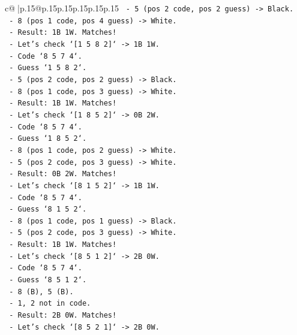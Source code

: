 \documentclass{article}
\begin{document}
{\begin{supertabular}{c@{$\;$}|p{.15\linewidth}@{}p{.15\linewidth}p{.15\linewidth}p{.15\linewidth}p{.15\linewidth}p{.15\linewidth}}
{{{\texttt{          {-} 5 (pos 2 code, pos 2 guess) {-}> Black.} \\
\texttt{          {-} 8 (pos 1 code, pos 4 guess) {-}> White.} \\
\texttt{          {-} Result: 1B 1W. Matches!} \\
\texttt{        {-} Let's check `{[}1 5 8 2{]}` {-}> 1B 1W.} \\
\texttt{          {-} Code `8 5 7 4`.} \\
\texttt{          {-} Guess `1 5 8 2`.} \\
\texttt{          {-} 5 (pos 2 code, pos 2 guess) {-}> Black.} \\
\texttt{          {-} 8 (pos 1 code, pos 3 guess) {-}> White.} \\
\texttt{          {-} Result: 1B 1W. Matches!} \\
\texttt{        {-} Let's check `{[}1 8 5 2{]}` {-}> 0B 2W.} \\
\texttt{          {-} Code `8 5 7 4`.} \\
\texttt{          {-} Guess `1 8 5 2`.} \\
\texttt{          {-} 8 (pos 1 code, pos 2 guess) {-}> White.} \\
\texttt{          {-} 5 (pos 2 code, pos 3 guess) {-}> White.} \\
\texttt{          {-} Result: 0B 2W. Matches!} \\
\texttt{        {-} Let's check `{[}8 1 5 2{]}` {-}> 1B 1W.} \\
\texttt{          {-} Code `8 5 7 4`.} \\
\texttt{          {-} Guess `8 1 5 2`.} \\
\texttt{          {-} 8 (pos 1 code, pos 1 guess) {-}> Black.} \\
\texttt{          {-} 5 (pos 2 code, pos 3 guess) {-}> White.} \\
\texttt{          {-} Result: 1B 1W. Matches!} \\
\texttt{        {-} Let's check `{[}8 5 1 2{]}` {-}> 2B 0W.} \\
\texttt{          {-} Code `8 5 7 4`.} \\
\texttt{          {-} Guess `8 5 1 2`.} \\
\texttt{          {-} 8 (B), 5 (B).} \\
\texttt{          {-} 1, 2 not in code.} \\
\texttt{          {-} Result: 2B 0W. Matches!} \\
\texttt{        {-} Let's check `{[}8 5 2 1{]}` {-}> 2B 0W.} \\
}}}
\end{supertabular}}
\end{document}
